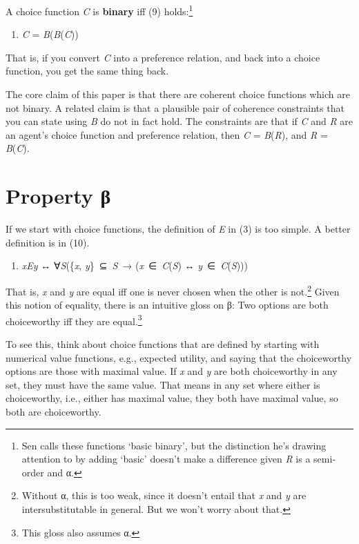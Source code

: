 \documentclass[
  11pt,
  letterpaper,
  DIV=11,
  numbers=noendperiod,
  twoside]{scrartcl}
\providecommand{\tightlist}{%
  \setlength{\itemsep}{0pt}\setlength{\parskip}{0pt}}
\begin{document}
A choice function \emph{C} is \textbf{binary} iff (9) holds:\footnote{Sen
  calls these functions `basic binary', but the distinction he's drawing
  attention to by adding `basic' doesn't make a difference given
  \emph{R} is a semi-order and α.}

\begin{enumerate}
\def\labelenumi{(\arabic{enumi})}
\setcounter{enumi}{8}
\tightlist
\item
  \emph{C} = \emph{B}(\emph{B}(\emph{C}))
\end{enumerate}

That is, if you convert \emph{C} into a preference relation, and back
into a choice function, you get the same thing back.

The core claim of this paper is that there are coherent choice functions
which are not binary. A related claim is that a plausible pair of
coherence constraints that you can state using \emph{B} do not in fact
hold. The constraints are that if \emph{C} and \emph{R} are an agent's
choice function and preference relation, then \emph{C} =
\emph{B}(\emph{R}), and \emph{R} = \emph{B}(\emph{C}).

\section{Property β}\label{property-ux3b2}

If we start with choice functions, the definition of \emph{E} in (3) is
too simple. A better definition is in (10).

\begin{enumerate}
\def\labelenumi{(\arabic{enumi})}
\setcounter{enumi}{9}
\tightlist
\item
  \emph{xEy} ↔ ∀\emph{S}(\{\emph{x}, \emph{y}\}~⊆~\emph{S}~→
  (\emph{x}~∈~\emph{C}(\emph{S}) ↔ \emph{y}~∈~\emph{C}(\emph{S})))
\end{enumerate}

That is, \emph{x} and \emph{y} are equal iff one is never chosen when
the other is not.\footnote{Without α, this is too weak, since it doesn't
  entail that \emph{x} and \emph{y} are intersubstitutable in general.
  But we won't worry about that.} Given this notion of equality, there
is an intuitive gloss on β: Two options are both choiceworthy iff they
are equal.\footnote{This gloss also assumes α.}

To see this, think about choice functions that are defined by starting
with numerical value functions, e.g., expected utility, and saying that
the choiceworthy options are those with maximal value. If \emph{x} and
\emph{y} are both choiceworthy in any set, they must have the same
value. That means in any set where either is choiceworthy, i.e., either
has maximal value, they both have maximal value, so both are
choiceworthy.
\end{document}
